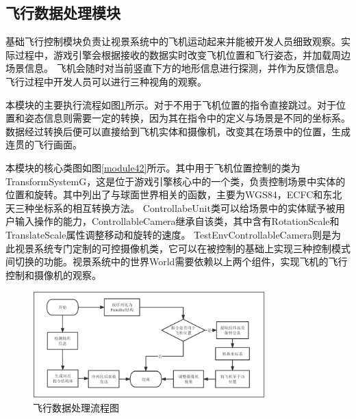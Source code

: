 \subsection{飞行数据处理模块}
基础飞行控制模块负责让视景系统中的飞机运动起来并能被开发人员细致观察。实际过程中，游戏引擎会根据接收的数据实时改变飞机位置和飞行姿态，并加载周边场景信息。
飞机会随时对当前竖直下方的地形信息进行探测，并作为反馈信息。飞行过程中开发人员可以进行三种视角的观察。
\par
本模块的主要执行流程如图\ref{module41}所示。对于不用于飞机位置的指令直接跳过。对于位置和姿态信息则需要一定的转换，因为其在指令中的定义与场景是不同的坐标系。数据经过转换后便可以直接给到飞机实体和摄像机，改变其在场景中的位置，生成连贯的飞行画面。
\par
本模块的核心类图如图\ref{module42}所示。其中用于飞机位置控制的类为TransformSystemG，这是位于游戏引擎核心中的一个类，负责控制场景中实体的位置和旋转。其中列出了与球面世界相关的函数，主要为WGS84，ECFC和东北天三种坐标系的相互转换方法。
ControllabeUnit类可以给场景中的实体赋予被用户输入操作的能力，ControllableCamera继承自该类，其中含有RotationScale和TranslateScale属性调整移动和旋转的速度。
TestEnvControllableCamera则是为此视景系统专门定制的可控摄像机类，它可以在被控制的基础上实现三种控制模式间切换的功能。视景系统中的世界World需要依赖以上两个组件，实现飞机的飞行控制和摄像机的观察。
\begin{figure}[h!]
    \begin{center}
        \includegraphics[width=0.8\textwidth]{pictures/flowchart4.pdf}
        \caption{飞行数据处理流程图}
        \label{module41}
    \end{center}
\end{figure}
